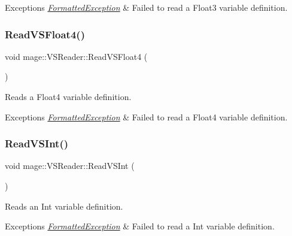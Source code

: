 \begin{DoxyExceptions}{Exceptions}
{\em \hyperlink{classmage_1_1_formatted_exception}{Formatted\+Exception}} & Failed to read a Float3 variable definition. \\
\hline
\end{DoxyExceptions}
\hypertarget{classmage_1_1_v_s_reader_aa1230cf0d6305f98172aabeacbfef8e0}{}\label{classmage_1_1_v_s_reader_aa1230cf0d6305f98172aabeacbfef8e0} 
\subsubsection{\texorpdfstring{Read\+V\+S\+Float4()}{ReadVSFloat4()}}
{\footnotesize\ttfamily void mage\+::\+V\+S\+Reader\+::\+Read\+V\+S\+Float4 (\begin{DoxyParamCaption}{ }\end{DoxyParamCaption})\hspace{0.3cm}{\ttfamily [private]}}

Reads a Float4 variable definition.


\begin{DoxyExceptions}{Exceptions}
{\em \hyperlink{classmage_1_1_formatted_exception}{Formatted\+Exception}} & Failed to read a Float4 variable definition. \\
\hline
\end{DoxyExceptions}
\hypertarget{classmage_1_1_v_s_reader_abbb6176a73ebddd88fc3ed58c89aa01a}{}\label{classmage_1_1_v_s_reader_abbb6176a73ebddd88fc3ed58c89aa01a} 
\subsubsection{\texorpdfstring{Read\+V\+S\+Int()}{ReadVSInt()}}
{\footnotesize\ttfamily void mage\+::\+V\+S\+Reader\+::\+Read\+V\+S\+Int (\begin{DoxyParamCaption}{ }\end{DoxyParamCaption})\hspace{0.3cm}{\ttfamily [private]}}

Reads an Int variable definition.


\begin{DoxyExceptions}{Exceptions}
{\em \hyperlink{classmage_1_1_formatted_exception}{Formatted\+Exception}} & Failed to read a Int variable definition. \\
\hline
\end{DoxyExceptions}
\hypertarget{classmage_1_1_v_s_reader_a4a3b90b47cb5e262a72df719674b9d93}{}\label{classmage_1_1_v_s_reader_a4a3b90b47cb5e262a72df719674b9d93} 
